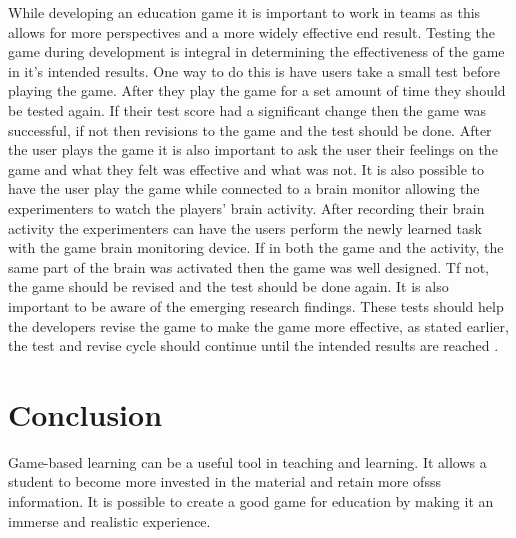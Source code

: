 While developing an education game it is important to work in teams as this allows for more perspectives and a more widely effective end result. Testing the game during development is integral in determining the effectiveness of the game in it's intended results. One way to do this is have users take a small test before playing the game. After they play the game for a set amount of time they should be tested again. If their test score had a significant change then the game was successful, if not then revisions to the game and the test should be done. After the user plays the game it is also important to ask the user their feelings on the game and what they felt was effective and what was not. It is also possible to have the user play the game while connected to a brain monitor allowing the experimenters to watch the players' brain activity. After recording their brain activity the experimenters can have the users perform the newly learned task with the game brain monitoring device. If in both the game and the activity, the same part of the brain was activated then the game was well designed. Tf not, the game should be revised and the test should be done again. It is also important to be aware of the emerging research findings. These tests should help the developers revise the game to make the game more effective, as stated earlier, the test and revise cycle should continue until the intended results are reached \cite{Tobias2014}.   


\section{Conclusion}
Game-based learning can be a useful tool in teaching and learning. It allows a student to become more invested in the material and retain more ofsss information. It is possible to create a good game for education by making it an immerse and realistic experience.  

